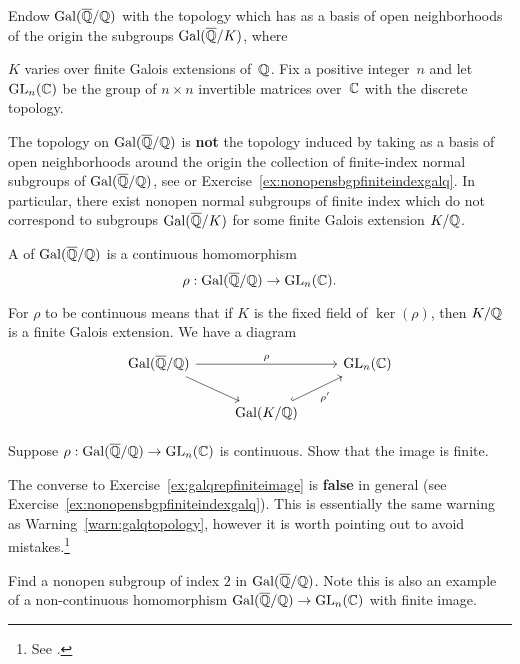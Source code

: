 Endow $\operatorname{Gal}(\overline{\mathbb{Q}}/\mathbb{Q})$ with the topology which has as a basis of open neighborhoods
of the origin the subgroups $\operatorname{Gal}(\overline{\mathbb{Q}}/K)$, where~{$K$ varies
over finite Galois extensions of~$\mathbb{Q}$.
Fix a positive integer~$n$ and let $\operatorname{GL}_n(\mathbb{C})$ be the group of
$n\times n$ invertible matrices over~$\mathbb{C}$ with the discrete topology.

\begin{warning}\label{warn:galqtopology}
  The topology on $\operatorname{Gal}(\overline{\mathbb{Q}}/\mathbb{Q})$ is {\bf not} the topology induced
  by taking as a basis of open neighborhoods around the origin
  the collection of finite-index normal subgroups of $\operatorname{Gal}(\overline{\mathbb{Q}}/\mathbb{Q})$,
  see \cite[Ch.~7]{milne:FT} or Exercise~\ref{ex:nonopensbgpfiniteindexgalq}.
  In particular, there exist nonopen normal subgroups of finite index which
  do not correspond to subgroups $\operatorname{Gal}(\overline{\mathbb{Q}}/K)$ for some finite Galois
  extension $K/\mathbb{Q}$.
\end{warning}

\begin{definition}
  A  of $\operatorname{Gal}(\overline{\mathbb{Q}}/\mathbb{Q})$
  is a continuous homomorphism
  \[
    \rho: \operatorname{Gal}(\overline{\mathbb{Q}}/\mathbb{Q}) \to \operatorname{GL}_n(\mathbb{C}).
  \]
\end{definition}
For $\rho$ to be continuous means that if $K$ is the fixed
field of $\ker(\rho)$, then $K/\mathbb{Q}$ is a finite Galois extension.
We have a diagram
\[
  \begin{tikzcd}
  \Gal(\overline{\QQ}/\QQ) \arrow{rr}{\rho} \arrow{dr} & & \GL_n(\CC) \\
  & \Gal(K/\QQ) \arrow[hook]{ur}[swap]{\rho'}
  \end{tikzcd}
\]

\begin{exercise}\label{ex:galqrepfiniteimage}
  Suppose $\rho:\operatorname{Gal}(\overline{\mathbb{Q}}/\mathbb{Q})\to\operatorname{GL}_n(\mathbb{C})$ is continuous.
  Show that the image is finite.
\end{exercise}

\begin{remark}
  The converse to Exercise~\ref{ex:galqrepfiniteimage}
  is \textbf{false} in general (see
  Exercise~\ref{ex:nonopensbgpfiniteindexgalq}).
  This is essentially the same warning as
  Warning~\ref{warn:galqtopology}, however it is worth
  pointing out to avoid mistakes.\footnote{
  See \cite[pg.~1]{artinconjectureLectureNotes}.}
\end{remark}

\begin{exercise}\label{ex:nonopensbgpfiniteindexgalq}
  Find a nonopen subgroup of index $2$ in $\operatorname{Gal}(\overline{\mathbb{Q}}/\mathbb{Q})$.
  Note this is also an example of a non-continuous
  homomorphism $\operatorname{Gal}(\overline{\mathbb{Q}}/\mathbb{Q})\to\operatorname{GL}_n(\mathbb{C})$ with finite image.


\end{exercise}}
